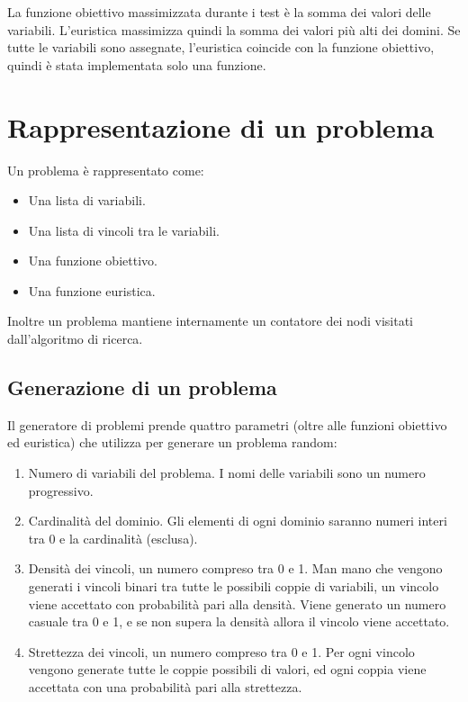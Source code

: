 \documentclass[a4paper,12pt,italian]{article}
\begin{document}
La funzione obiettivo massimizzata durante i test \`e la somma dei
valori delle variabili. L'euristica massimizza quindi la somma dei
valori pi\`u alti dei domini. Se tutte le variabili sono assegnate,
l'euristica coincide con la funzione obiettivo, quindi \`e stata
implementata solo una funzione.

\section{Rappresentazione di un problema}

Un problema \`e rappresentato come:

\begin{itemize}
\item Una lista di variabili.
\item Una lista di vincoli tra le variabili.
\item Una funzione obiettivo.
\item Una funzione euristica.
\end{itemize}

Inoltre un problema mantiene internamente un contatore dei nodi
visitati dall'algoritmo di ricerca.

\subsection{Generazione di un problema}

Il generatore di problemi prende quattro parametri (oltre alle
funzioni obiettivo ed euristica) che utilizza per generare un problema
random:

\begin{enumerate}
\item Numero di variabili del problema. I nomi delle variabili sono un
  numero progressivo.
\item Cardinalit\`a del dominio. Gli elementi di ogni dominio saranno
  numeri interi tra 0 e la cardinalit\`a (esclusa).
\item Densit\`a dei vincoli, un numero compreso tra 0 e 1. Man mano che vengono generati i vincoli
  binari tra tutte le possibili coppie di variabili, un vincolo viene accettato
  con probabilit\`a pari alla densit\`a. Viene generato un numero
  casuale tra 0 e 1, e se non supera la densit\`a allora il vincolo
  viene accettato.
\item Strettezza dei vincoli, un numero compreso tra 0 e 1. Per ogni
  vincolo vengono generate tutte le coppie possibili di valori, ed
  ogni coppia viene accettata con una probabilit\`a pari alla
  strettezza.
\end{enumerate}
\end{document}
